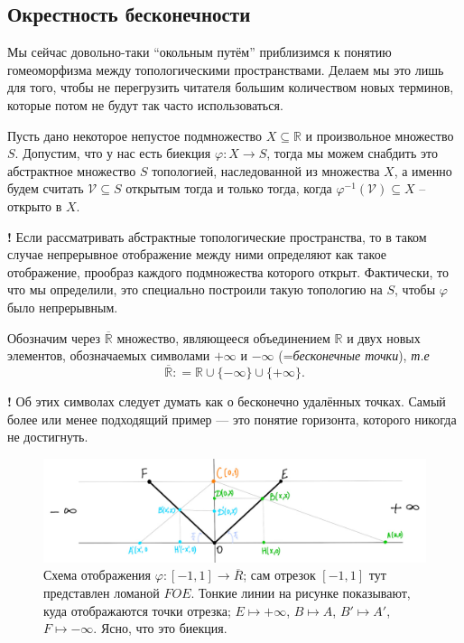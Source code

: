 \subsection{Окрестность бесконечности}\label{neighborhood_of_infinity}

Мы сейчас довольно-таки ``окольным путём'' приблизимся к понятию гомеоморфизма между топологическими пространствами. Делаем мы это лишь для того, чтобы не перегрузить читателя большим количеством новых терминов, которые потом не будут так часто использоваться.

\begin{construction}\label{con_of_induced_topology}
 Пусть дано некоторое непустое подмножество $X\subseteq \mathbb{R}$ и произвольное множество $S$. Допустим, что у нас есть биекция $\varphi:X \to S$, тогда мы можем снабдить это абстрактное множество $S$ топологией, наследованной из множества $X$, а именно будем считать $\mathscr{V} \subseteq S$ открытым тогда и только тогда, когда $\varphi^{-1}(\mathscr{V}) \subseteq X$ -- открыто в $X.$
\end{construction}

\begin{mydangerr}{\bf !}
    Если рассматривать абстрактные топологические пространства, то в таком случае непрерывное отображение между ними определяют как такое отображение, прообраз каждого подмножества которого открыт. Фактически, то что мы определили, это специально построили такую топологию на $S$, чтобы $\varphi$ было непрерывным.
\end{mydangerr}


\begin{definition}
 Обозначим через $\overline{\mathbb{R}}$ множество, являющееся объединением $\mathbb{R}$ и двух новых элементов, обозначаемых символами $+\infty$ и $-\infty$ (=\textit{бесконечные точки}), \textit{т.е}
\[
 \overline{\mathbb{R}}: = \mathbb{R}\cup \{-\infty\} \cup \{+\infty\}.
\]
\end{definition}

\begin{mydanger}{\bf !}
Об этих символах следует думать как о бесконечно удалённых точках. Самый более или менее подходящий пример — это понятие горизонта, которого никогда не достигнуть.
\end{mydanger}

\begin{figure}
    \centering
    \includegraphics[width=1\linewidth]{images/infty.jpg}
    \caption{Схема отображения $\varphi: [-1,1] \to \overline{R}$; сам отрезок $[-1,1]$ тут представлен ломаной $FOE$. Тонкие линии на рисунке показывают, куда отображаются точки отрезка; $E \mapsto +\infty$, $B \mapsto A$, $B' \mapsto A'$, $F \mapsto -\infty$. Ясно, что это биекция.}
    \label{infnty_picture}
\end{figure}


